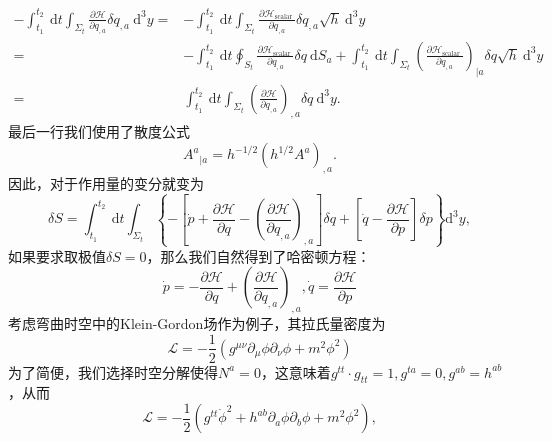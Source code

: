 \documentclass[hyperref, UTF8, a4paper]{ctexart}
\begin{document}
\begin{equation*}
	\begin{aligned}
		-\int _{t_{1}}^{t_{2}}\mathrm{\ d} t\int _{\Sigma _{t}}\frac{\mathcal{\partial H}}{\partial q_{,a}} \delta q_{,a}\mathrm{\ d}^{3} y= & -\int _{t_{1}}^{t_{2}}\mathrm{\ d} t\int _{\Sigma _{t}}\frac{\mathcal{\partial H}_{\text{scalar }}}{\partial q_{,a}} \delta q_{,a}\sqrt{h}\mathrm{\ d}^{3} y\\
		= & -\int _{t_{1}}^{t_{2}}\mathrm{\ d} t\oint _{S_{t}}\frac{\mathcal{\partial H}_{\text{scalar }}}{\partial q_{,a}} \delta q\mathrm{\ d} S_{a} +\int _{t_{1}}^{t_{2}}\mathrm{\ d} t\int _{\Sigma _{t}}\left(\frac{\mathcal{\partial H}_{\text{scalar }}}{\partial q_{,a}}\right)_{\mid a} \delta q\sqrt{h}\mathrm{\ d}^{3} y\\
		= & \int _{t_{1}}^{t_{2}}\mathrm{\ d} t\int _{\Sigma _{t}}\left(\frac{\mathcal{\partial H}}{\partial q_{,a}}\right)_{,a} \delta q\mathrm{\ d}^{3} y.
	\end{aligned}
\end{equation*}
最后一行我们使用了散度公式
\begin{equation*}
	A^{a}{}_{|a} =h^{-1/2} (h^{1/2} A^{a} )_{,a} .
\end{equation*}
因此，对于作用量的变分就变为
\begin{equation*}
	\delta S=\int _{t_{1}}^{t_{2}} \ \mathrm{d} t\int _{\Sigma _{t}}\left\{-\left[\dot{p} +\frac{\mathcal{\partial H}}{\partial q} -\left(\frac{\mathcal{\partial H}}{\partial q_{,a}}\right)_{,a}\right] \delta q+\left[\dot{q} -\frac{\mathcal{\partial H}}{\partial p}\right] \delta p\right\}\mathrm{d}^{3} y,
\end{equation*}
如果要求取极值$\delta S=0$，那么我们自然得到了哈密顿方程：
\begin{equation*}
	\boxed{\dot{p} =-\frac{\mathcal{\partial H}}{\partial q} +\left(\frac{\mathcal{\partial H}}{\partial q_{,a}}\right)_{,a} ,\dot{q} =\frac{\mathcal{\partial H}}{\partial p}}
\end{equation*}
考虑弯曲时空中的Klein-Gordon场作为例子，其拉氏量密度为
\begin{equation*}
	\mathcal{L} =-\frac{1}{2}\left( g^{\mu \nu } \partial _{\mu } \phi \partial _{\nu } \phi +m^{2} \phi ^{2}\right)
\end{equation*}
为了简便，我们选择时空分解使得$N^{a} =0$，这意味着$g^{tt} \cdot g_{tt} =1,g^{ta} =0,g^{ab} =h^{ab}$，从而
\begin{equation*}
	\mathcal{L} =-\frac{1}{2}\left( g^{tt}\dot{\phi }^{2} +h^{ab} \partial _{a} \phi \partial _{b} \phi +m^{2} \phi ^{2}\right) ,
\end{equation*}
\end{document}
